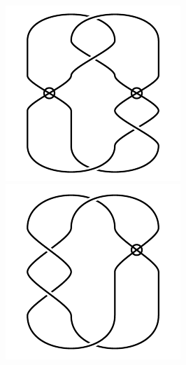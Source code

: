 \begin{figure}[H]
\begin{minipage}[b]{.18\linewidth}
\end{minipage}
\begin{minipage}[b]{.18\linewidth}
\centering
\includegraphics[width=\linewidth]{../data/virtual_4_99.png}
\end{minipage}
\begin{minipage}[b]{.18\linewidth}
\centering
\includegraphics[width=\linewidth]{../data/virtual_4_100.png}

\end{minipage}
\end{figure}
